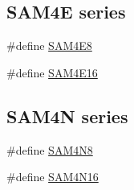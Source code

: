 \subsection*{S\+A\+M4E series}
\begin{DoxyCompactItemize}
\item 
\#define \mbox{\hyperlink{group__sam__part__macros__group_ga698232ea02e61922d22e02b339796a50}{S\+A\+M4\+E8}}
\item 
\#define \mbox{\hyperlink{group__sam__part__macros__group_ga7e756ab3c18b6c54de1d7f376e13eaa3}{S\+A\+M4\+E16}}
\end{DoxyCompactItemize}
\subsection*{S\+A\+M4N series}
\begin{DoxyCompactItemize}
\item 
\#define \mbox{\hyperlink{group__sam__part__macros__group_ga820cb6819d43d98db4ea8ee4d40adb8a}{S\+A\+M4\+N8}}
\item 
\#define \mbox{\hyperlink{group__sam__part__macros__group_gad92bacc1b6c870d806f48e8195527911}{S\+A\+M4\+N16}}
\end{DoxyCompactItemize}
